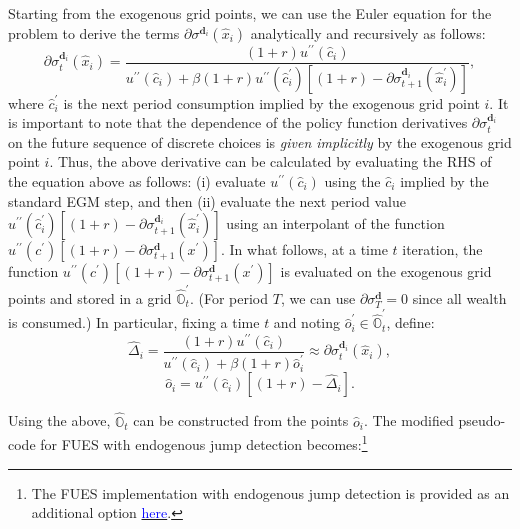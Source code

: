 \documentclass[12pt]{article}
\begin{document}
Starting from the exogenous grid points, we can use the Euler equation for the problem to derive the terms $\partial \sigma^{\textbf{d}_{i}}(\hat{x}_{i})$ analytically and recursively as follows:
%
\begin{equation}
\partial \sigma^{\textbf{d}_{i}}_{t}(\hat{x}_{i}) =
\frac{(1+r)u^{\prime\prime}(\hat{c}_{i})}{u^{\prime\prime}(\hat{c}_{i}) + \beta(1+r)u^{\prime\prime}(\hat{c}_{i}^{\prime})[(1+r) - \partial \sigma^{\textbf{d}_{i}}_{t+1}(\hat{x}_{i}^{\prime}) ]},
\end{equation}
%
where $\hat{c}_{i}^{\prime}$ is the next period consumption implied by the exogenous grid point $i$. It is important to note that the dependence of the policy function derivatives $\partial \sigma^{\textbf{d}_{i}}_{t}$ on the future sequence of discrete choices is \textit{given implicitly} by the exogenous grid point $i$. Thus, the above derivative can be calculated by evaluating the RHS of the equation above as follows: (i) evaluate $u^{\prime\prime}(\hat{c}_{i})$ using the $\hat{c}_{i}$ implied by the standard EGM step, and then (ii) evaluate the next period value $u^{\prime\prime}(\hat{c}_{i}^{\prime})\left[ (1+r) - \partial \sigma^{\textbf{d}_{i}}_{t+1}(\hat{x}_{i}^{\prime})\right]$ using an interpolant of the function $u^{\prime\prime}(c^{\prime})[ (1+r) - \partial \sigma^{\textbf{d}}_{t+1}(x^{\prime})]$. In what follows, at a time $t$ iteration, the function $u^{\prime\prime}(c^{\prime})\left[ (1+r) - \partial \sigma^{\textbf{d}}_{t+1}(x^{\prime})\right]$
is evaluated on the exogenous grid points and stored in a grid $\hat{\mathbb{O}}_{t}^{\prime}$. (For period $T$, we can use 
$\partial \sigma^{\textbf{d}}_{T} = 0$ since all wealth is consumed.) In particular, fixing a time $t$ and noting $\hat{o}_{i}^{\prime}\in \hat{\mathbb{O}}^{\prime}_{t}$, define:
%
\begin{equation}
\hat{\Delta}_{i} = \frac{(1+r)u^{\prime\prime}(\hat{c}_{i})}{u^{\prime\prime}(\hat{c}_{i}) + \beta(1+r)\hat{o}_{i}^{\prime}} \approx \partial \sigma_{t}^{\textbf{d}_{i}}(\hat{x}_i),
\end{equation}
%
\begin{equation}
\hat{o}_{i} = u^{\prime\prime}(\hat{c}_{i})\left[(1+r) - \hat{\Delta}_{i} \right].
\end{equation}

Using the above, $\hat{\mathbb{O}}_{t}$ can be constructed from the points $\hat{o}_{i}$. The modified pseudo-code for FUES with endogenous jump detection becomes:\footnote{The FUES implementation with endogenous jump detection is provided as an additional option \href{http://github.com/akshayshanker/FUES_EGM}{\textcolor{blue}{here}}.}
\end{document}
